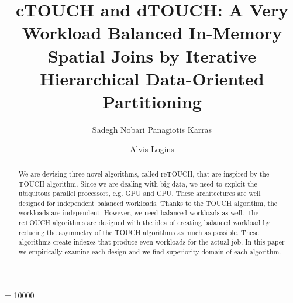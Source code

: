\documentclass{sig-alternate}
\begin{document}
\title{cTOUCH and dTOUCH: A Very Workload Balanced In-Memory Spatial Joins by Iterative Hierarchical Data-Oriented Partitioning}
\widowpenalty = 10000


\author{
\alignauthor Sadegh Nobari
\alignauthor Panagiotis Karras
\and
\alignauthor Alvis Logins
\and{}
}


\maketitle

\begin{abstract}
We are devising three novel algorithms, called reTOUCH, that are inspired by the TOUCH algorithm. Since we are dealing with big data, we need to exploit the ubiquitous parallel processors, e.g. GPU and CPU. These architectures are well designed for independent balanced workloads. Thanks to the TOUCH algorithm, the workloads are independent. However, we need balanced workloads as well. The reTOUCH algorithms are designed with the idea of creating balanced workload by reducing the asymmetry of the TOUCH algorithms as much as possible. These algorithms create indexes that produce even workloads for the actual job. In this paper we empirically examine each design and we find superiority domain of each algorithm.
\end{abstract}
\end{document}
